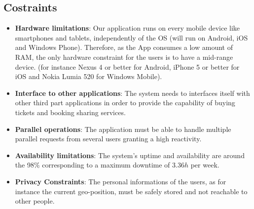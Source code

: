 \documentclass[numbers=noenddot, 12pt, a4paper, oneside]{scrbook}
\begin{document}
\subsection*{Costraints}

\begin{itemize}
	\item \textbf{Hardware limitations}: Our application runs on every mobile device like smartphones and tablets, independently of the OS (will run on Android, iOS and Windows Phone). Therefore, as the App consumes a low amount of RAM, the only hardware constraint for the users is to have a mid-range device. (for instance Nexus 4 or better for Android, iPhone 5 or better for iOS and Nokia Lumia 520 for Windows Mobile).
	\item \textbf{Interface to other applications}: The system needs to interfaces itself with other third part applications in order to provide the capability of buying tickets and booking sharing services.
	\item \textbf{Parallel operations}: The application must be able to handle multiple parallel requests from several users granting a high reactivity.
	\item \textbf{Availability limitations}: The system's uptime and availability are around the 98\% corresponding to a maximum downtime of $3.36h$ per week.
	\item \textbf{Privacy Constraints}: The personal informations of the users, as for instance the current geo-position, must be safely stored and not reachable to other people.
\end{itemize}
\end{document}
